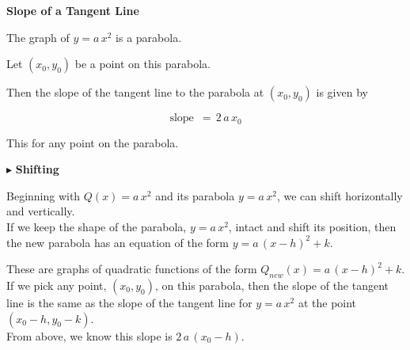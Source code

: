 \documentclass{ximera}
\begin{document}
\begin{conclusion} \textbf{\textcolor{green!50!black}{Slope of a Tangent Line}} 


The graph of $y = a \, x^2$ is a parabola.

Let $(x_0, y_0)$ be a point on this parabola.

Then the slope of the tangent line to the parabola at $(x_0, y_0)$ is given by 



\[ \text{slope } \, = \, 2 \, a \, x_0  \]


\end{conclusion}
This for any point on the parabola.




















$\blacktriangleright$ \textbf{Shifting}




Beginning with $Q(x) = a \, x^2$ and its parabola $y = a \, x^2$, we can shift horizontally and vertically. \\





If we keep the shape of the parabola, $y = a \, x^2$, intact and shift its position, then the new parabola has an equation of the form $y = a \, (x - h)^2 + k$.

These are graphs of quadratic functions of the form $Q_{new}(x) = a \, (x - h)^2 + k$. \\


If we pick any point, $(x_0, y_0)$, on this parabola, then the slope of the tangent line is the same as the slope of the tangent line for $y = a \, x^2$ at the point $(x_0 - h, y_0 - k)$.  \\

From above, we know this slope is $2 \, a \, (x_0 - h)$.
\end{document}
